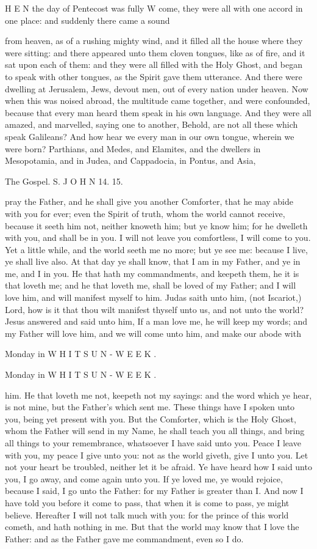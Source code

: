H E N the day of Pentecost was fully W come, they were all with one accord in one place: and suddenly there came a sound

from heaven, as of a rushing mighty wind, and it filled all the house where they were sitting: and there appeared unto them cloven tongues, like as of fire, and it sat upon each of them: and they were all filled with the Holy Ghost, and began to speak with other tongues, as the Spirit gave them utterance. And there were dwelling at Jerusalem, Jews, devout men, out of every nation under heaven. Now when this was noised abroad, the multitude came together, and were confounded, because that every man heard them speak in his own language. And they were all amazed, and marvelled, saying one to another, Behold, are not all these which speak Galileans? And how hear we every man in our own tongue, wherein we were born? Parthians, and Medes, and Elamites, and the dwellers in Mesopotamia, and in Judea, and Cappadocia, in Pontus, and Asia,

The Gospel. S. J O H N 14. 15.

pray the Father, and he shall give you another Comforter, that he may abide with you for ever; even the Spirit of truth, whom the world cannot receive, because it seeth him not, neither knoweth him; but ye know him; for he dwelleth with you, and shall be in you. I will not leave you comfortless, I will come to you. Yet a little while, and the world seeth me no more; but ye see me: because I live, ye shall live also. At that day ye shall know, that I am in my Father, and ye in me, and I in you. He that hath my commandments, and keepeth them, he it is that loveth me; and he that loveth me, shall be loved of my Father; and I will love him, and will manifest myself to him. Judas saith unto him, (not Iscariot,) Lord, how is it that thou wilt manifest thyself unto us, and not unto the world? Jesus answered and said unto him, If a man love me, he will keep my words; and my Father will love him, and we will come unto him, and make our abode with

Monday in W H I T S U N - W E E K .

Monday in W H I T S U N - W E E K .

him. He that loveth me not, keepeth not my sayings: and the word which ye hear, is not mine, but the Father’s which sent me. These things have I spoken unto you, being yet present with you. But the Comforter, which is the Holy Ghost, whom the Father will send in my Name, he shall teach you all things, and bring all things to your remembrance, whatsoever I have said unto you. Peace I leave with you, my peace I give unto you: not as the world giveth, give I unto you. Let not your heart be troubled, neither let it be afraid. Ye have heard how I said unto you, I go away, and come again unto you. If ye loved me, ye would rejoice, because I said, I go unto the Father: for my Father is greater than I. And now I have told you before it come to pass, that when it is come to pass, ye might believe. Hereafter I will not talk much with you: for the prince of this world cometh, and hath nothing in me. But that the world may know that I love the Father: and as the Father gave me commandment, even so I do.


